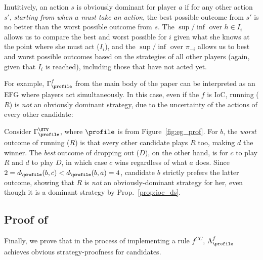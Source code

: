 Inutitively, an action $s$ is obviously dominant  for player $a$ if for any other action $s'$, \emph{starting from when $a$ must take an action}, the best possible outcome from $s'$ is no better than the worst possible outcome from $s$. The $\sup/\inf$ over $h \in I_i$ allows us to compare the best and worst possible for $i$ given what she knows at the point where she must act ($I_i$), and the $\sup/\inf$ over $\pi_{-i}$ allows us to best and worst possible outcomes based on the strategies of all other players (again, given that $I_i$ is reached), including those that have not acted yet. 

For example, $\Gamma^f_{\profile}$ from the main body of the paper can be interpreted as an EFG where players act simultaneously. In this case, even if the $f$ is IoC, running ($R$) is \emph{not} an obviously dominant strategy, due to the uncertainty of the actions of every other candidate: 
\begin{example}
    Consider $\Gamma^{\STV}_{\profile}$, where $\profile$ is from Figure~\ref{fig:eg_prof}. For $b$, the \emph{worst} outcome of running ($R$) is that every other candidate plays $R$ too, making $d$ the winner. The \emph{best} outcome of dropping out ($D$), on the other hand, is for $c$ to play $R$ and $d$ to play $D$, in which case $c$ wins regardless of what $a$ does. Since $2=d_{\profile}(b,c)< d_{\profile}(b,a)=4$, candidate $b$ strictly prefers the latter outcome, showing that $R$ is \emph{not} an obviously-dominant strategy for her, even though it is a dominant strategy by Prop.~\ref{prop:ioc_ds}. 
\end{example}

\subsection{Proof of }
Finally, we prove that in the process of implementing a rule $f^{CC}$, $\Lambda_{\profile}^f$ achieves obvious strategy-proofness for candidates.
\ccods*

